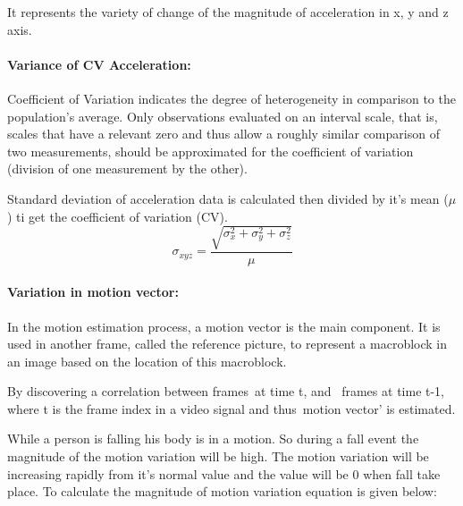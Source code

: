  
It represents the variety of change of the magnitude of acceleration in x, y and z axis.


 \paragraph{\textbf{Variance of CV Acceleration:}}
 Coefficient of Variation indicates the degree of heterogeneity in comparison to the population's average. Only observations evaluated on an interval scale, that is, scales that have a relevant zero and thus allow a roughly similar comparison of two measurements, should be approximated for the coefficient of variation (division of one measurement by the other).
 
 Standard deviation of acceleration data is calculated then divided by it’s mean ($\mu$) ti get the coefficient of variation (CV).
\begin{equation}
    \sigma_{xyz}=\frac{\sqrt{\sigma_x^2+\sigma_y^2+\sigma_z^2 }}{\mu}
\end{equation}
    


\paragraph{\textbf{Variation in motion vector:}}

In the motion estimation process, a motion vector is the main component. It is used in another frame, called the reference picture, to represent a macroblock in an image based on the location of this macroblock.

By discovering a correlation between frames at time t, and  frames at time t-1, where t is the frame index in a video signal and thus motion vector' is estimated.

While a person is falling his body is in a motion. So during a fall event the magnitude of the motion variation will be high. The motion variation will be increasing rapidly from it's normal value and the value will be 0 when fall take place.
To calculate the magnitude of motion variation equation is given below:

